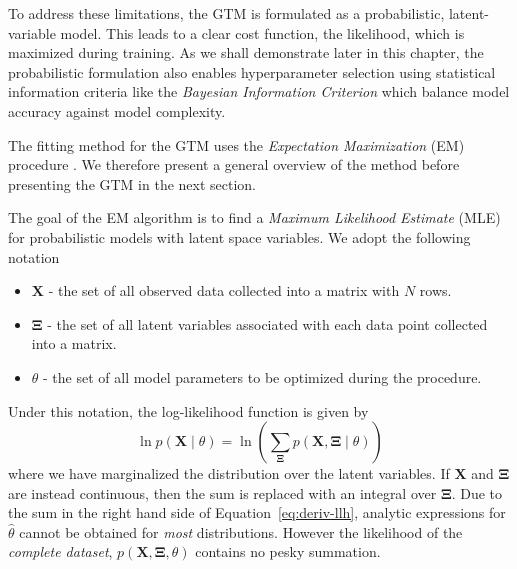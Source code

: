 To address these limitations, the GTM is formulated as a probabilistic,
latent-variable model. This leads to a clear cost function, the likelihood,
which is maximized during training. As we shall demonstrate later in this
chapter, the probabilistic formulation also enables hyperparameter selection
using statistical information criteria like the \textit{Bayesian Information
  Criterion} which balance model accuracy against model complexity.

The fitting method for the GTM uses the \textit{Expectation Maximization} (EM)
procedure \cite{em-algorithm}. We therefore present a general overview of the method
before presenting the GTM in the next section.

The goal of the EM algorithm is to find a \textit{Maximum Likelihood Estimate}
(MLE) for probabilistic models with latent space variables. We adopt the
following notation
\begin{itemize}
  \item $\mathbf{X}$ - the set of all observed data collected into a matrix with
    $N$ rows.
  \item $\mathbf{\Xi}$ - the set of all latent variables associated with each
    data point collected into a matrix.
  \item $\theta$ - the set of all model parameters to be optimized during the procedure.
\end{itemize}
Under this notation, the log-likelihood function is given by
\begin{equation}\label{eq:deriv-llh}
  \ln p\left(\mathbf{X} \mid \theta \right) = \ln \left(  \sum_{\mathbf{\Xi}}p\left( \mathbf{X},\mathbf{\Xi} \mid \theta \right) \right)
\end{equation}
where we have marginalized the distribution over the latent variables. If
$\mathbf{X}$ and $\mathbf{\Xi}$ are instead continuous, then the sum is replaced
with an integral over $\mathbf{\Xi}$. Due to the sum in the right hand side of
Equation~\ref{eq:deriv-llh}, analytic expressions for $\hat{\theta}$ cannot be
obtained for \textit{most} distributions. However the likelihood of the
\textit{complete dataset}, $p\left( \mathbf{X}, \mathbf{\Xi}, \theta \right)$
contains no pesky summation.

